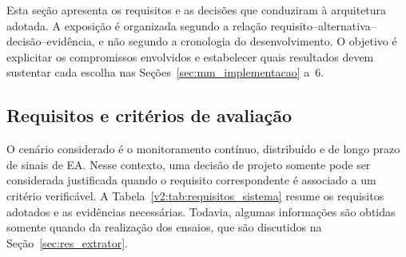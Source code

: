 
Esta seção apresenta os requisitos e as decisões que conduziram à arquitetura adotada. A exposição é organizada segundo a relação requisito--alternativa--decisão--evidência, e não segundo a cronologia do desenvolvimento. O objetivo é explicitar os compromissos envolvidos e estabelecer quais resultados devem sustentar cada escolha nas Seções~\ref{sec:mm_implementacao} a~6.

\subsection{Requisitos e critérios de avaliação}
\label{v2:subsec:requisitos_arquitetura}

O cenário considerado é o monitoramento contínuo, distribuído e de longo prazo de sinais de EA. Nesse contexto, uma decisão de projeto somente pode ser considerada justificada quando o requisito correspondente é associado a um critério verificável. A Tabela~\ref{v2:tab:requisitos_sistema} resume os requisitos adotados e as evidências necessárias. Todavia, algumas informações são obtidas somente quando da realização dos ensaios, que são discutidos na Seção~\ref{sec:res_extrator}.


